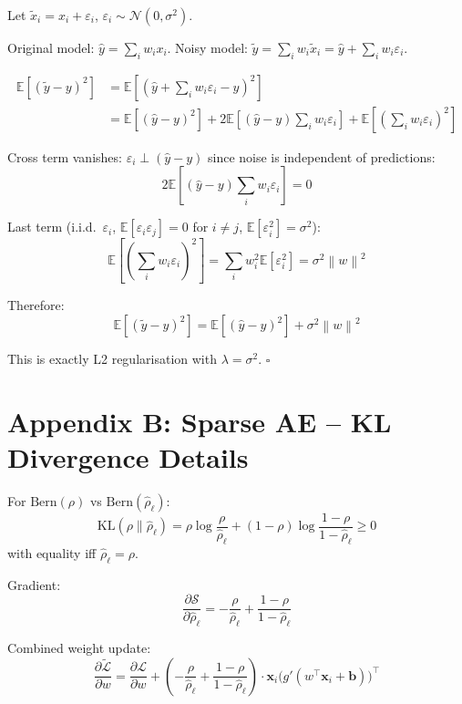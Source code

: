 \documentclass[12pt,a4paper]{article}
\newcommand{\E}{\mathbb{E}}
\newcommand{\norm}[1]{\left\|#1\right\|}
\newcommand{\vx}{\mathbf{x}}
\newcommand{\vb}{\mathbf{b}}
\newcommand{\Loss}{\mathcal{L}}
\newcommand{\Reg}{\mathcal{S}}
\begin{document}
\begin{theorembox}[title={Full Derivation}]
Let $\tilde{x}_i = x_i + \varepsilon_i$, $\varepsilon_i \sim \mathcal{N}(0, \sigma^2)$.

Original model: $\hat{y} = \sum_i w_i x_i$.
Noisy model: $\tilde{y} = \sum_i w_i\tilde{x}_i = \hat{y} + \sum_i w_i\varepsilon_i$.

\begin{align*}
  \E[(\tilde{y}-y)^2]
  &= \E\!\left[(\hat{y} + \sum_i w_i\varepsilon_i - y)^2\right]\\
  &= \E[(\hat{y}-y)^2]
    + 2\E\!\left[(\hat{y}-y)\sum_i w_i\varepsilon_i\right]
    + \E\!\left[\left(\sum_i w_i\varepsilon_i\right)^2\right]
\end{align*}

Cross term vanishes: $\varepsilon_i \perp (\hat{y}-y)$ since noise is independent of predictions:
\[
  2\E\!\left[(\hat{y}-y)\sum_i w_i\varepsilon_i\right] = 0
\]

Last term (i.i.d.\ $\varepsilon_i$, $\E[\varepsilon_i\varepsilon_j] = 0$ for $i\neq j$, $\E[\varepsilon_i^2]=\sigma^2$):
\[
  \E\!\left[\left(\sum_i w_i\varepsilon_i\right)^2\right]
  = \sum_i w_i^2\E[\varepsilon_i^2] = \sigma^2\norm{w}^2
\]

Therefore:
\[
  \E[(\tilde{y}-y)^2] = \E[(\hat{y}-y)^2] + \sigma^2\norm{w}^2
\]

This is exactly L2 regularisation with $\lambda = \sigma^2$. \hfill$\square$
\end{theorembox}

\section{Appendix B: Sparse AE -- KL Divergence Details}

\begin{theorembox}[title={KL Divergence Between Bernoullis}]
For $\mathrm{Bern}(\rho)$ vs $\mathrm{Bern}(\hat{\rho}_\ell)$:
\[
  \mathrm{KL}(\rho\|\hat{\rho}_\ell)
  = \rho\log\frac{\rho}{\hat{\rho}_\ell} + (1-\rho)\log\frac{1-\rho}{1-\hat{\rho}_\ell}
  \geq 0
\]
with equality iff $\hat{\rho}_\ell = \rho$.

Gradient:
\[
  \frac{\partial\Reg}{\partial\hat{\rho}_\ell}
  = -\frac{\rho}{\hat{\rho}_\ell} + \frac{1-\rho}{1-\hat{\rho}_\ell}
\]

Combined weight update:
\[
  \frac{\partial\tilde{\Loss}}{\partial w}
  = \frac{\partial\Loss}{\partial w}
  + \left(-\frac{\rho}{\hat{\rho}_\ell} + \frac{1-\rho}{1-\hat{\rho}_\ell}\right)
    \cdot \vx_i\bigl(g'(w^\top\vx_i+\vb)\bigr)^\top
\]
\end{theorembox}
\end{document}
